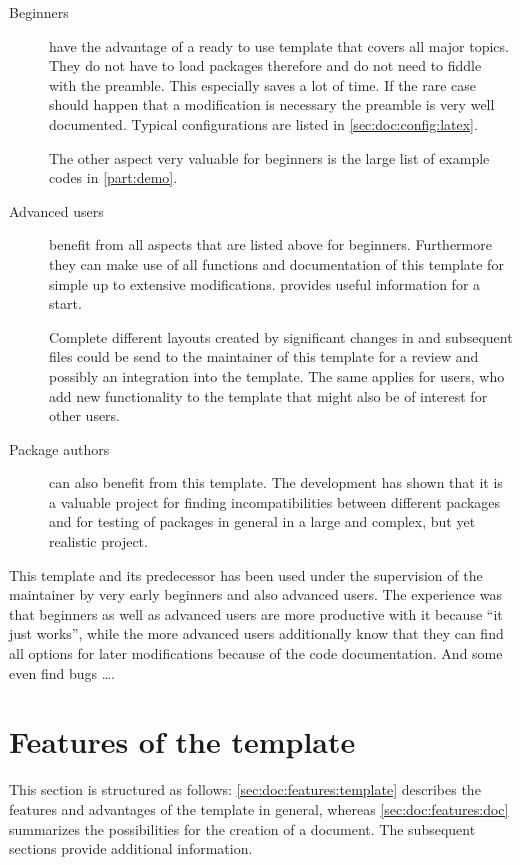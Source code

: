 \begin{description}
\item[Beginners] have the advantage of a ready to use template that covers all major topics. They do not have to load packages therefore and do not need to fiddle with the preamble. This especially saves a lot of time. If the rare case should happen that a modification is necessary the preamble is very well documented. Typical configurations are listed in \cref{sec:doc:config:latex}.

The other aspect very valuable for beginners is the large list of example codes in \cref{part:demo}. 
%
\item[Advanced \latex users] benefit from all aspects that are listed above for beginners. Furthermore they can make use of all functions and documentation of this template for simple up to extensive modifications.  provides useful information for a start.

Complete different layouts created by significant changes in  and subsequent files could be send to the maintainer of this template for a review and possibly an integration into the template. The same applies for users, who add new functionality to the template that might also be of interest for other users.
%
\item[Package authors] can also benefit from this template. The development has shown that it is a valuable project for finding incompatibilities between different packages and for testing of packages in general in a large and complex, but yet realistic project. 
\end{description}

This template and its predecessor has been used under the supervision of the maintainer by very early beginners and also advanced \latex users. The experience was that beginners as well as advanced users are more productive with it because \enquote{it just works}, while the more advanced users additionally know that they can find all options for later modifications because of the code documentation. And some even find bugs \ldots.

\section{Features of the template}
\label{sec:doc:features}

This section is structured as follows: \cref{sec:doc:features:template} describes the features and advantages of the template in general, whereas \cref{sec:doc:features:doc} summarizes the possibilities for the creation of a document. The subsequent sections provide additional information.

